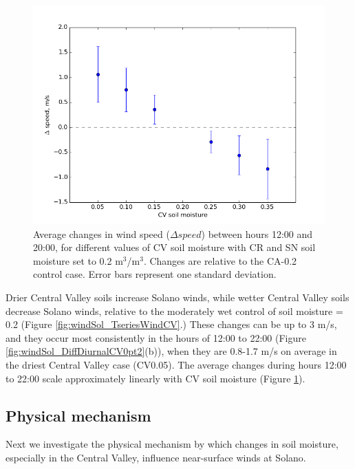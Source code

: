 \begin{figure}[here]
\includegraphics[width=1\textwidth]{ch3-wind/img/shifts_CVsmois_12-20_d02.png}
\caption{Average changes in wind speed ($\Delta speed$) between hours 12:00 and 20:00, for different values of CV soil moisture with CR and SN soil moisture set to 0.2 m$^3$/m$^3$.  Changes are relative to the CA-0.2 control case.  Error bars represent one standard deviation.}
\label{fig:windSol_ShiftsMaxCV}
\end{figure}

Drier Central Valley soils increase Solano winds, while wetter Central Valley soils decrease Solano winds, relative to the moderately wet control of soil moisture = 0.2 (Figure \ref{fig:windSol_TseriesWindCV}.)  These changes can be up to 3 m/s, and they occur most consistently in the hours of 12:00 to 22:00 (Figure \ref{fig:windSol_DiffDiurnalCV0pt2}(b)), when they are 0.8-1.7 m/s on average in the driest Central Valley case (CV0.05).  The average changes during hours 12:00 to 22:00 scale approximately linearly with CV soil moisture (Figure \ref{fig:windSol_ShiftsMaxCV}).

\clearpage

\subsection{Physical mechanism}
\label{subsec:PhysMech}

Next we investigate the physical mechanism by which changes in soil moisture, especially in the Central Valley, influence near-surface winds at Solano.  

